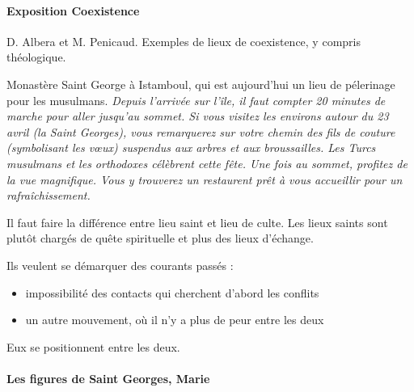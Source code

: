 \paragraph{Exposition Coexistence} D. Albera et M. Penicaud.  Exemples de lieux de coexistence, y compris théologique.
\begin{Ex}
    Monastère Saint George à Istamboul, qui est aujourd'hui un lieu de pélerinage pour les musulmans.
    \textit{Depuis l'arrivée sur l’île, il faut compter 20 minutes de marche pour aller jusqu'au sommet. Si vous visitez les environs autour du 23 avril (la Saint Georges), vous remarquerez sur votre chemin des fils de couture (symbolisant les vœux) suspendus aux arbres et aux broussailles. Les Turcs musulmans et les orthodoxes célèbrent cette fête. Une fois au sommet, profitez de la vue magnifique. Vous y trouverez un restaurent prêt à vous accueillir pour un rafraîchissement.}
\end{Ex}

Il faut faire la différence entre lieu saint et lieu de culte. Les lieux saints sont plutôt chargés de quête spirituelle et plus des lieux d'échange.

Ils veulent se démarquer des courants passés :
\begin{itemize}
    \item impossibilité des contacts qui cherchent d'abord les conflits
    \item un autre mouvement, où il n'y a  plus de peur entre les deux
\end{itemize}
Eux se positionnent entre les deux. 

\paragraph{Les figures de Saint Georges, Marie} 